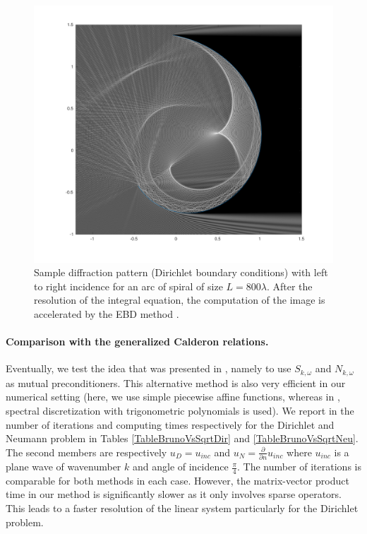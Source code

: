 \documentclass[a4paper]{article}
\begin{document}
\begin{figure}[H]
	\centering
	\includegraphics[width=\linewidth]{figs/arcOfSpiral800_3}
	\vspace{-1.2cm}
	\caption{Sample diffraction pattern (Dirichlet boundary conditions) with left to right incidence for an arc of spiral of size $L = 800 \lambda$. 
	After the resolution of the integral equation, the computation of the image is accelerated by the EBD method \cite{averseng2017}.}
	\label{ArcOfSpiral}
\end{figure}

\paragraph{Comparison with the generalized Calderon relations.} Eventually, we test the idea that was presented in \cite{bruno2012second}, namely 
to use $S_{k,\omega}$ and $N_{k,\omega}$ as mutual preconditioners. This alternative method is also very efficient in our numerical setting (here, we use 
simple piecewise affine functions, whereas in \cite{bruno2012second}, spectral discretization with trigonometric polynomials is used). We report in 
the number of iterations and computing times respectively for the Dirichlet and Neumann problem in Tables  \ref{TableBrunoVsSqrtDir} and \ref{TableBrunoVsSqrtNeu}. The second members are respectively $u_D = u_{inc}$ and $u_N = \frac{\partial}{\partial n} u_{inc}$ where $u_{inc}$ is a plane wave of wavenumber $k$ and angle of incidence $\frac{\pi}{4}$. The number of iterations is comparable for both methods in each case. However, the matrix-vector product time in our method is significantly 
slower as it only involves sparse operators. This leads to a faster resolution of the linear system particularly for the Dirichlet problem.
\end{document}
